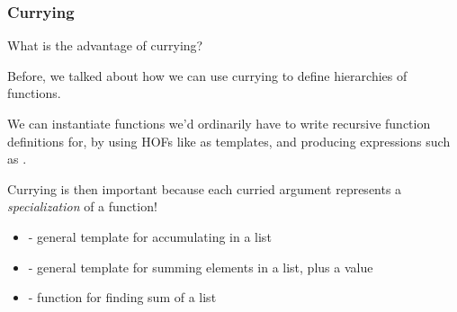 \documentclass[aspectratio=169]{beamer}
\begin{document}
\begin{frame}[fragile]
  \frametitle{Currying}

  What is the advantage of currying?

  \pause
  \vspace{\fill}

  Before, we talked about how we can use currying to define hierarchies of functions.
  
  \pause
  \vspace{\fill}

  We can instantiate functions we'd ordinarily have to write recursive function definitions
  for, by using HOFs like  as templates, and producing expressions such as
  .

  \pause
  \vspace{\fill}

  Currying is then important because each curried argument represents a \textit{specialization}
  of a function!

  \pause
  \vspace{\fill}
  
  \begin{itemize}
    \item {} - general template for accumulating in a list \pause
    \item {} - general template for summing elements in a list, plus a value \pause
    \item {} - function for finding sum of a list
  \end{itemize}
\end{frame}
\end{document}

